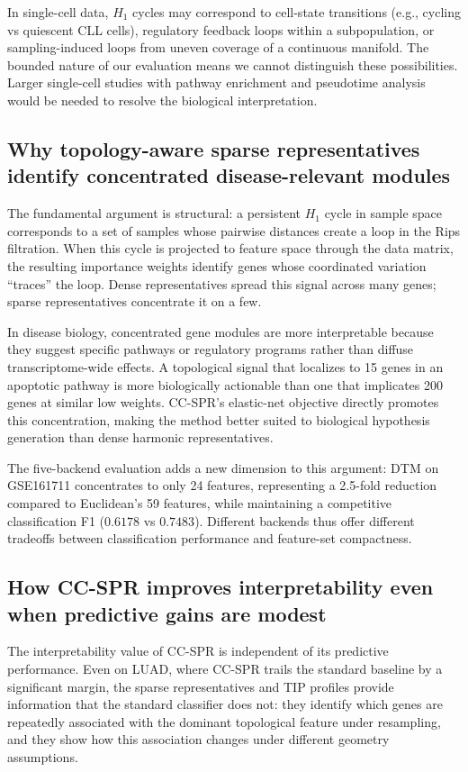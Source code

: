 \documentclass[11pt]{article}
\begin{document}
In single-cell data, $H_1$ cycles may correspond to cell-state transitions (e.g., cycling vs quiescent CLL cells), regulatory feedback loops within a subpopulation, or sampling-induced loops from uneven coverage of a continuous manifold.
The bounded nature of our evaluation means we cannot distinguish these possibilities.
Larger single-cell studies with pathway enrichment and pseudotime analysis would be needed to resolve the biological interpretation.

\subsection{Why topology-aware sparse representatives identify concentrated disease-relevant modules}

The fundamental argument is structural: a persistent $H_1$ cycle in sample space corresponds to a set of samples whose pairwise distances create a loop in the Rips filtration.
When this cycle is projected to feature space through the data matrix, the resulting importance weights identify genes whose coordinated variation ``traces'' the loop.
Dense representatives spread this signal across many genes; sparse representatives concentrate it on a few.

In disease biology, concentrated gene modules are more interpretable because they suggest specific pathways or regulatory programs rather than diffuse transcriptome-wide effects.
A topological signal that localizes to 15 genes in an apoptotic pathway is more biologically actionable than one that implicates 200 genes at similar low weights.
CC-SPR's elastic-net objective directly promotes this concentration, making the method better suited to biological hypothesis generation than dense harmonic representatives.

The five-backend evaluation adds a new dimension to this argument: DTM on GSE161711 concentrates to only 24 features, representing a 2.5-fold reduction compared to Euclidean's 59 features, while maintaining a competitive classification F1 ($0.6178$ vs $0.7483$).
Different backends thus offer different tradeoffs between classification performance and feature-set compactness.

\subsection{How CC-SPR improves interpretability even when predictive gains are modest}

The interpretability value of CC-SPR is independent of its predictive performance.
Even on LUAD, where CC-SPR trails the standard baseline by a significant margin, the sparse representatives and TIP profiles provide information that the standard classifier does not: they identify which genes are repeatedly associated with the dominant topological feature under resampling, and they show how this association changes under different geometry assumptions.
\end{document}
